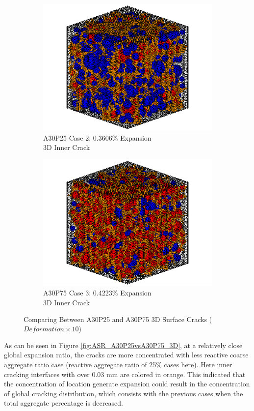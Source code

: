 \begin{figure}[ht!]
\centering

    \begin{subfigure}{.5\textwidth}
      \centering
      \includegraphics[width=.8\linewidth]{Files/exp_3D/ASR/A30P25_2_c.png}
    \caption{A30P25 Case 2: 0.3606\% Expansion \\ 3D Inner Crack}
    \end{subfigure}%
    \begin{subfigure}{.5\textwidth}
      \centering
      \includegraphics[width=.8\linewidth]{Files/exp_3D/ASR/A30P75_3_c.png}
    \caption{A30P75 Case 3: 0.4223\% Expansion\\ 3D Inner Crack}
    \end{subfigure}

  \caption{Comparing Between A30P25 and A30P75 3D Surface Cracks ($Deformation \times 10$)}
  \label{fig:ASR_A30P25vsA30P75_3D_crack}
\end{figure}

As can be seen in Figure \ref{fig:ASR_A30P25vsA30P75_3D}, at a relatively close global expansion ratio, the cracks are more concentrated with less reactive coarse aggregate ratio case (reactive aggregate ratio of 25\% cases here). Here inner cracking interfaces with over 0.03 mm are colored in orange. This indicated that the concentration of location generate expansion could result in the concentration of global cracking distribution, which consists with the previous cases when the total aggregate percentage is decreased.

